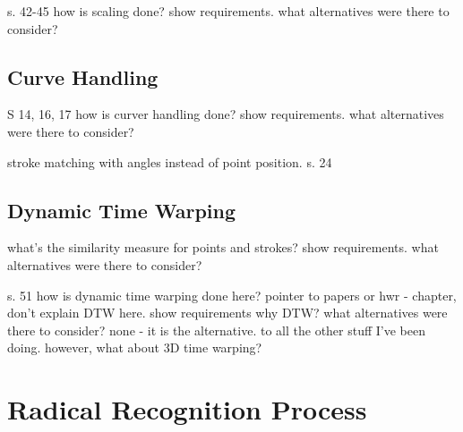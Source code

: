 s. 42-45
how is scaling done?
show requirements.
what alternatives were there to consider?

\subsection{Curve Handling}
\label{sec:hwre:curvehandling}

S 14, 16, 17
how is curver handling done?
show requirements.
what alternatives were there to consider?

stroke matching with angles instead of point position.
s. 24

\subsection{Dynamic Time Warping}
\label{sec:hwre:dynamictimewarping}

what's the similarity measure for
points and strokes?
show requirements.
what alternatives were there to consider?

s. 51
how is dynamic time warping done here?
pointer to papers or hwr - chapter, don't explain DTW here.
show requirements
why DTW?
what alternatives were there to consider?
none - it is the alternative.
to all the other stuff I've been doing.
however, what about 3D time warping?


\section{Radical Recognition Process}
\label{sec:hwre:radicalrecognitionprocess}






